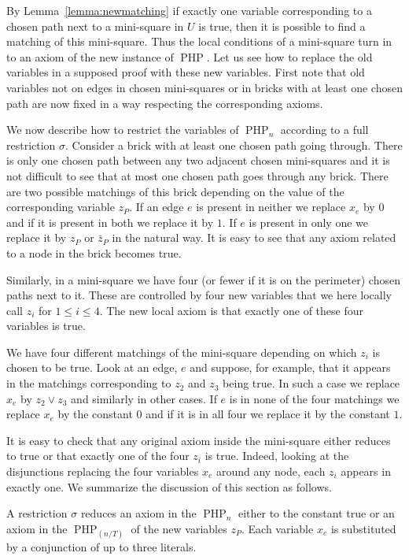 \documentclass{theoretics}
\DeclareMathOperator{\PHP}{PHP}
\begin{document}
By Lemma~\ref{lemma:newmatching} if exactly one
variable corresponding to a chosen path next to a mini-square in $U$ is true,
then it is possible to find a matching of this mini-square.
Thus the local conditions of a mini-square turn in to
an axiom of the new instance of $\PHP$.
Let us see how to replace the old variables
in a supposed proof with these new variables.
First note that old variables not on edges in chosen mini-squares
or in bricks with at least one chosen path
are now fixed in a way respecting the corresponding
axioms.

We now describe how to restrict the variables of $\PHP_n$
according to a full restriction $\sigma$.
Consider a brick with at least one chosen path
going through.  There is only one chosen path
between any two adjacent chosen mini-squares and it is not difficult to
see that at
most one chosen path goes through any brick.
There are two possible matchings of this brick
depending on the value of the corresponding
variable $z_P$.  If an edge $e$ is present in
neither we replace $x_e$ by $0$ and if it is
present in both we replace it by $1$.
If $e$ is present in only one we replace it
by $z_P$ or $\bar z_P$ in the natural way.
It is easy to see that any axiom
related to a node in the brick becomes
true.

Similarly, in a mini-square we have
four (or fewer if it is on the perimeter) chosen
paths next to it. These are controlled by four
new variables that we here locally call
$z_i$ for $1 \leq i \leq 4$.  The new local
axiom is that exactly one of these four
variables is true.

We have four different matchings of the mini-square
depending on which $z_i$ is chosen to be true.
Look at an edge, $e$ and suppose, for example, that it appears 
in the matchings corresponding to $z_2$ and $z_3$
being true.  In such a case we replace $x_e$ by $z_2 \lor z_3$ and
similarly in other cases.  If $e$ is in none of the
four matchings we replace $x_e$ by the constant $0$ and
if it is in all four we replace it by
the constant $1$.

It is easy to check that any original axiom inside
the mini-square either reduces to true or that
exactly one of the four $z_i$ is true.
Indeed, looking at the disjunctions replacing
the four variables $x_e$ around any node, each $z_i$ appears
in exactly one.  We summarize the discussion of
this section as follows.
\begin{lemma}\label{lemma:reduced}
A restriction $\sigma$ reduces an axiom in the 
$\PHP_n$ either
to the constant true or an axiom in the $\PHP_{(n/T)}$ of
the new variables $z_P$.
Each variable $x_e$ is substituted by a conjunction
of up to three literals.
\end{lemma}
\end{document}

